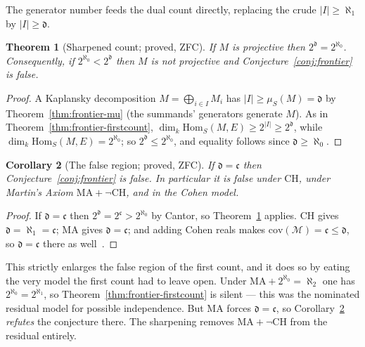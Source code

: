 \documentclass[11pt]{report}
\theoremstyle{plain}
\newtheorem{theorem}{Theorem}[chapter]
\newtheorem{corollary}[theorem]{Corollary}
\theoremstyle{definition}
\theoremstyle{remark}
\newcommand{\dd}{\mathfrak{d}}
\newcommand{\cont}{\mathfrak{c}}
\newcommand{\Hom}{\mathrm{Hom}}
\begin{document}
The generator number feeds the dual count directly, replacing the crude
$|I|\ge\aleph_1$ by $|I|\ge\dd$.

\begin{theorem}[Sharpened count; proved, ZFC]\label{thm:frontier-sharpcount}
If $M$ is projective then $2^{\dd}=2^{\aleph_0}$. Consequently, if
$2^{\aleph_0}<2^{\dd}$ then $M$ is not projective and
Conjecture~\ref{conj:frontier} is false.
\end{theorem}

\begin{proof}
A Kaplansky decomposition $M=\bigoplus_{i\in I}M_i$ has $|I|\ge\mu_S(M)=\dd$ by
Theorem~\ref{thm:frontier-mu} (the summands' generators generate $M$). As in
Theorem~\ref{thm:frontier-firstcount}, $\dim_k\Hom_S(M,E)\ge 2^{|I|}\ge2^{\dd}$,
while $\dim_k\Hom_S(M,E)=2^{\aleph_0}$; so $2^{\dd}\le2^{\aleph_0}$, and equality
follows since $\dd\ge\aleph_0$.
\end{proof}

\begin{corollary}[The false region; proved, ZFC]\label{cor:frontier-false}
If $\dd=\cont$ then Conjecture~\ref{conj:frontier} is false. In particular it is
false under $\mathrm{CH}$, under Martin's Axiom $\mathrm{MA}+\neg\mathrm{CH}$,
and in the Cohen model.
\end{corollary}

\begin{proof}
If $\dd=\cont$ then $2^{\dd}=2^{\cont}>2^{\aleph_0}$ by Cantor, so
Theorem~\ref{thm:frontier-sharpcount} applies. $\mathrm{CH}$ gives
$\dd=\aleph_1=\cont$; $\mathrm{MA}$ gives $\dd=\cont$; and adding Cohen reals
makes $\mathrm{cov}(\mathcal M)=\cont\le\dd$, so $\dd=\cont$ there as
well~\cite{blass,bartoszynski-judah}.
\end{proof}

This strictly enlarges the false region of the first count, and it does so by
eating the very model the first count had to leave open. Under
$\mathrm{MA}+2^{\aleph_0}=\aleph_2$ one has $2^{\aleph_0}=2^{\aleph_1}$, so
Theorem~\ref{thm:frontier-firstcount} is silent --- this was the nominated
residual model for possible independence. But $\mathrm{MA}$ forces $\dd=\cont$,
so Corollary~\ref{cor:frontier-false} \emph{refutes} the conjecture there. The
sharpening removes $\mathrm{MA}+\neg\mathrm{CH}$ from the residual entirely.
\end{document}
